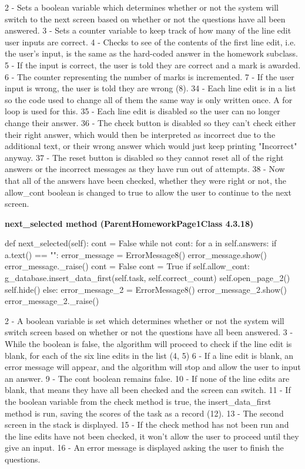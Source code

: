 2 - Sets a boolean variable which determines whether or not the system will switch to the next screen based on whether or not the questions have all been answered.
3 - Sets a counter variable to keep track of how many of the line edit user inputs are correct.
4 - Checks to see of the contents of the first line edit, i.e. the user's input, is the same as the hard-coded answer in the homework subclass.
5 - If the input is correct, the user is told they are correct and a mark is awarded.
6 - The counter representing the number of marks is incremented.
7 - If the user input is wrong, the user is told they are wrong (8).
34 - Each line edit is in a list so the code used to change all of them the same way is only written once. A for loop is used for this.
35 - Each line edit is disabled so the user can no longer change their answer.
36 - The check button is disabled so they can't check either their right answer, which would then be interpreted as incorrect due to the additional text, or their wrong answer which would just keep printing "Incorrect" anyway.
37 - The reset button is disabled so they cannot reset all of the right answers or the incorrect messages as they have run out of attempts.
38 - Now that all of the answers have been checked, whether they were right or not, the allow\_cont boolean is changed to true to allow the user to continue to the next screen.

\textbf{next\_selected method (ParentHomeworkPage1Class 4.3.18)}

\begin{python}
def next_selected(self):
        cont = False
        while not cont:
            for a in self.answers:
                if a.text() == "":
                    error_message = ErrorMessage8()
                    error_message.show()
                    error_message._raise()
                    cont = False
            cont = True
            if self.allow_cont:
                g_database.insert_data_first(self.task, self.correct_count)
                self.open_page_2()
                self.hide()
            else:
                error_message_2 = ErrorMessage8()
                error_message_2.show()
                error_message_2._raise()
\end{python}

2 - A boolean variable is set which determines whether or not the system will switch screen based on whether or not the questions have all been answered.
3 - While the boolean is false, the algorithm will proceed to check if the line edit is blank, for each of the six line edits in the list (4, 5)
6 - If a line edit is blank, an error message will appear, and the algorithm will stop and allow the user to input an answer.
9 - The cont boolean remains false.
10 - If none of the line edits are blank, that means they have all been checked and the screen can switch.
11 - If the boolean variable from the check method is true, the insert\_data\_first method is run, saving the scores of the task as a record (12).
13 - The second screen in the stack is displayed.
15 - If the check method has not been run and the line edits have not been checked, it won't allow the user to proceed until they give an input.
16 - An error message is displayed asking the user to finish the questions.

